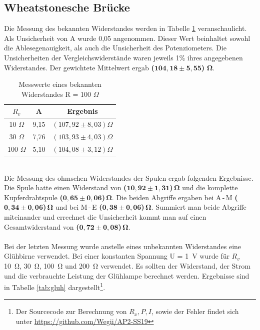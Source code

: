 \documentclass[a4paper,usenatbib]{aspdoc}
\begin{document}
        \subsection{Wheatstonesche Brücke}\label{subsec:result_wheatstone}
            Die Messung des bekannten Widerstandes werden in Tabelle \ref{tab:mewh} veranschaulicht. Als Unsicherheit von A wurde 0,05 angenommen. Dieser Wert beinhaltet sowohl die Ablesegenauigkeit, als auch die Unsicherheit des Potenziometers. Die Unsicherheiten der Vergleichswiderstände waren jeweils 1\% ihres angegebenen Widerstandes. Der gewichtete Mittelwert ergab \textbf{(}$\mathbf{104,18 \pm 5,55}$\textbf{)} $\mathbf{\Omega}$. \\ 
            \begin{table}
                \centering
                \begin{tabular}{c|c|c}
                    \multicolumn{1}{c}{$R_v$} & \multicolumn{1}{c}{A} & \multicolumn{1}{c}{Ergebnis}\\
                    \cmidrule(l){0-0}\cmidrule(lr){2-2}\cmidrule(lr){3-3}
                    \toprule
                    10 $\Omega$ & 9,15 & $(107,92 \pm 8,03) \Omega$ \\
                    30 $\Omega$ & 7,76 & $(103,93 \pm 4,03) \Omega $ \\
                    100 $\Omega$ & 5,10 & $(104,08 \pm 3,12) \Omega $ \\
                    \bottomrule
                \end{tabular}
                \caption{Messwerte eines bekannten Widerstandes R = 100 $\Omega$}
                \label{tab:mewh}
            \end{table}
            \\
            Die Messung des ohmschen Widerstandes der Spulen ergab folgenden Ergebnisse.\\
            Die Spule hatte einen Widerstand von \textbf{(}$\mathbf{10,92 \pm 1,31}$\textbf{)}$\,\mathbf{\Omega}$ und die komplette Kupferdrahtspule \textbf{(}$\mathbf{0,65 \pm 0,06}$\textbf{)}$\,\mathbf{\Omega}$. Die beiden Abgriffe ergaben bei A\,-\,M \textbf{(}$\mathbf{0,34 \pm 0,06}$\textbf{)}$\,\mathbf{\Omega}$ und bei M\,-\,E \textbf{(}$\mathbf{0,38 \pm 0,06}$\textbf{)}$\,\mathbf{\Omega}$. Summiert man beide Abgriffe miteinander und errechnet die Unsicherheit kommt man auf einen Gesamtwiderstand von \textbf{(}$\mathbf{0,72 \pm 0,08}$\textbf{)}$\,\mathbf{\Omega}$.\\
            \\
            Bei der letzten Messung wurde anstelle eines unbekannten Widerstandes eine Glühbirne verwendet. Bei einer konstanten Spannung U = \SI{1}{\volt} wurde für $R_v$ \SI{10}{\ohm}, \SI{30}{\ohm}, \SI{100}{\ohm} und \SI{200}{\ohm} verwendet. Es sollten der Widerstand, der Strom und die verbrauchte Leistung der Glühlampe berechnet werden. Ergebnisse sind in Tabelle \ref{tab:gluh} dargestellt\footnote{Der Sourcecode zur Berechnung von $R_x, P, I$, sowie der Fehler findet sich unter \url{https://github.com/Wegii/AP2-SS19}\label{note:source}}.
\end{document}
